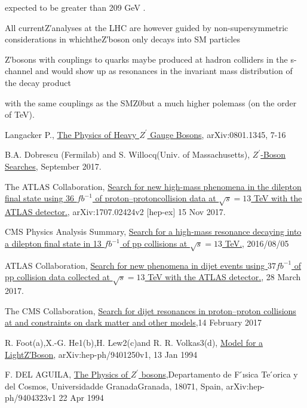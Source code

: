 \documentclass[12pt,a4paper]{article}		%
\begin{document}
 
expected to be greater than 209 GeV .


  All currentZ′analyses at the LHC are however guided by non-supersymmetric considerations in whichtheZ′boson only decays into SM particles  

Z′bosons with couplings to quarks maybe produced at hadron colliders in the s-channel and would show up as resonances in the invariant mass distribution of the decay product
 

with  the  same  couplings  as  the  SMZ0but a much higher polemass (on the order of TeV).     

\newpage
\begin{thebibliography}{}
	 Langacker P., \href{https://arxiv.org/abs/0801.1345v3}{The Physics of Heavy $Z^\prime$ Gauge Bosons}, arXiv:0801.1345, 7-16
	
	  B.A. Dobrescu (Fermilab) and S. Willocq(Univ. of Massachusetts), \href{http://pdg.lbl.gov/2017/reviews/rpp2017-rev-zprime-searches.pdf}{$Z^\prime$-Boson Searches}, September 2017.
	
	 The ATLAS Collaboration, \href{https://arxiv.org/pdf/1707.02424.pdf}{Search for new high-mass phenomena in the dilepton final state using 36 $fb^{−1}$ of proton–protoncollision data at $\sqrt{s}=13$ TeV with the ATLAS detector.}, arXiv:1707.02424v2  [hep-ex]  15 Nov 2017.
	
	 CMS Physics Analysis Summary, \href{http://inspirehep.net/record/1479666/files/EXO-16-031-pas.pdf?version=1}{Search for a high-mass resonance decaying into a dilepton final state in 13 $fb^{−1}$ of pp collisions at $\sqrt{s}=13$ TeV.}, 2016/08/05
	  
	 ATLAS Collaboration, \href{https://journals.aps.org/prd/pdf/10.1103/PhysRevD.96.052004 }{Search for new phenomena in dijet events using $37fb^{-1}$ of pp collision data collected at $\sqrt{s}=13$ TeV with the ATLAS detector.}, 28 March 2017.  
	
	 The CMS Collaboration, \href{https://www.sciencedirect.com/science/article/pii/S0370269317301028?via%3Dihub}{Search for dijet resonances in proton–proton collisions at and constraints on dark matter and other models},14 February 2017 
		
	 R. Foot(a),X.-G. He1(b),H. Lew2(c)and R. R. Volkas3(d), \href{https://arxiv.org/pdf/hep-ph/9401250.pdf}{Model for a LightZ′Boson}, arXiv:hep-ph/9401250v1, 13 Jan 1994	
	
	 F. DEL AGUILA,  \href{https://arxiv.org/pdf/hep-ph/9404323.pdf}{The Physics of $Z^\prime$ bosons},Departamento de F ́ısica Te ́orica y del Cosmos, Universidadde GranadaGranada, 18071, Spain, arXiv:hep-ph/9404323v1  22 Apr 1994
	

\end{thebibliography}
\end{document}
